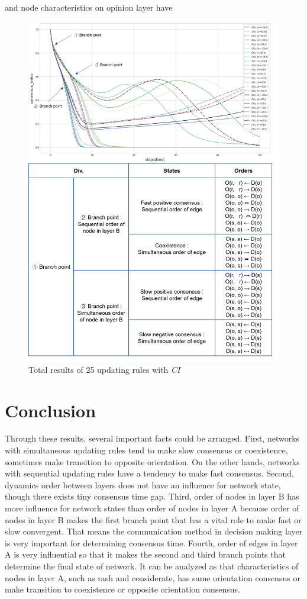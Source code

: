 and node characteristics on opinion layer have  
\begin{figure}[!htb]
	\centering
	\includegraphics[width=\hsize]{figure/chap4_ordertotal2.png}
	\caption{Total results of 25 updating rules with \textit{CI}}
	\label{ordertotal2}
\end{figure}


\section{Conclusion}
Through these results, several important facts could be arranged. First, networks with simultaneous updating rules tend to make slow consensus or coexistence, sometimes make transition to opposite orientation. On the other hands, networks with sequential updating rules have a tendency to make fast consensus. Second, dynamics order between layers does not have an influence for network state, though there exists tiny consensus time gap. Third, order of nodes in layer B has more influence for network states than order of nodes in layer A because order of nodes in layer B makes the first branch point that has a vital role to make fast or slow convergent. That means the communication method in decision making layer is very important for determining consensus time. Fourth, order of edges in layer A is very influential so that it makes the second and third branch points that determine the final state of network. It can be analyzed as that characteristics of nodes in layer A, such as rash and considerate, has same orientation consensus or make transition to coexistence or opposite orientation consensus.



